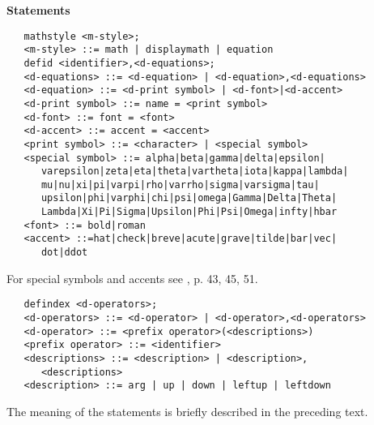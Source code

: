 {\bf Statements}

\begin{verbatim}
   mathstyle <m-style>;
   <m-style> ::= math | displaymath | equation
   defid <identifier>,<d-equations>;
   <d-equations> ::= <d-equation> | <d-equation>,<d-equations>
   <d-equation> ::= <d-print symbol> | <d-font>|<d-accent>
   <d-print symbol> ::= name = <print symbol>
   <d-font> ::= font = <font>
   <d-accent> ::= accent = <accent>
   <print symbol> ::= <character> | <special symbol>
   <special symbol> ::= alpha|beta|gamma|delta|epsilon|
      varepsilon|zeta|eta|theta|vartheta|iota|kappa|lambda|
      mu|nu|xi|pi|varpi|rho|varrho|sigma|varsigma|tau|
      upsilon|phi|varphi|chi|psi|omega|Gamma|Delta|Theta|
      Lambda|Xi|Pi|Sigma|Upsilon|Phi|Psi|Omega|infty|hbar
   <font> ::= bold|roman
   <accent> ::=hat|check|breve|acute|grave|tilde|bar|vec|
      dot|ddot
\end{verbatim}

For special symbols and accents see \cite{Lamport:86}, p. 43, 45, 51.

\begin{verbatim}
   defindex <d-operators>;
   <d-operators> ::= <d-operator> | <d-operator>,<d-operators>
   <d-operator> ::= <prefix operator>(<descriptions>)
   <prefix operator> ::= <identifier>
   <descriptions> ::= <description> | <description>,
      <descriptions>
   <description> ::= arg | up | down | leftup | leftdown
\end{verbatim}

The meaning of the statements is briefly described in the preceding
text.
